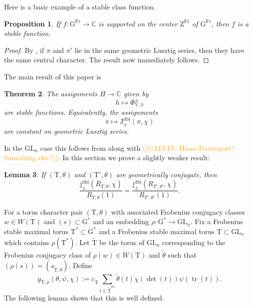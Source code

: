 \documentclass[12pt, reqno]{amsart}
\newtheorem{theorem}{Theorem}[section]
\newtheorem{proposition}[theorem]{Proposition}
\newtheorem{lemma}[theorem]{Lemma}
\theoremstyle{definition}
\theoremstyle{definition}
\theoremstyle{definition}
\newcommand{\cComplex}{\mathbb{C}}
\newcommand{\hermitianSpace}{\mathrm{V}}
\newcommand{\trace}{\operatorname{tr}}
\newcommand{\GL}{\mathrm{GL}}
\newcommand{\Frobenius}{\operatorname{Fr}}
\newcommand{\genHermitianJacobiKernel}[2]{\Phi^{\pm}_{#1,#2}}
\newcommand{\dblJacobiSumScalar}[2]{\mathrm{J}_{\pm}^{\mathrm{dbl}}\left(#1, #2\right)}
\newcommand{\dblVirtualJacobiSumScalar}[2]{\mathrm{j}_{\pm}^{\mathrm{dbl}}\left(#1, #2\right)}
\newcommand{\algebraicGroup}[1]{\boldsymbol{\mathrm{#1}}}
\newcommand{\calvin}[1]{\textcolor{orange}{\sffamily ((CALVIN: #1))}}
\begin{document}
Here is a basic example of a stable class function.
\begin{proposition}
\label{prop:central_char}
    If $f \colon \algebraicGroup{G}^{\Frobenius} \to \cComplex$ is supported on the center $\algebraicGroup{Z}^{\Frobenius}$ of $\algebraicGroup{G}^{\Frobenius}$, then $f$ is a stable function.
\end{proposition}
\begin{proof}
By \cite[Lemma 2.2]{Malle2007}, if $\pi$ and $\pi'$ lie in the same geometric Lusztig series, then they have the same central character. The result now immediately follows.
\end{proof}


The main result of this paper is 
\begin{theorem}
\label{thm:Phi_stable}
	The assignments $H \to \cComplex$ given by $$h \mapsto \genHermitianJacobiKernel{\hermitianSpace}{h}$$ are stable functions. Equivalently, the assignments $$\pi \mapsto \dblJacobiSumScalar{\pi}{\chi}$$ are constant on geometric Lusztig series.
\end{theorem}
In the $\GL_n$ case this follows from  along with \calvin{Hasse-Davenport? Something else?}.
In this section we prove a slightly weaker result:

\begin{lemma}
\label{lem:indep_geo_conj}
    If $(\algebraicGroup{T},\theta)$ and $(\algebraicGroup{T}', \theta)$ are geometrically conjugate, then $$\frac{\dblVirtualJacobiSumScalar{R_{T, \theta}}{\chi}}{R_{T,\theta}(1)} = \frac{\dblVirtualJacobiSumScalar{R_{T', \theta'}}{\chi}}{R_{T',\theta'}(1)}.$$
\end{lemma}


For a torus character pair $(\algebraicGroup{T},\theta)$ with associated Frobenius conjugacy classes $w \in W(\algebraicGroup{T})$ and $(s) \subset \algebraicGroup{G}^*$ and an embedding $\rho:\algebraicGroup{G}^* \to \algebraicGroup{\GL}_n$.  Fix a Frobenius stable maximal torus $\algebraicGroup{T}^* \subset \algebraicGroup{G}^*$ and a Frobenius stable maximal torus $\algebraicGroup{T} \subset \algebraicGroup{\GL}_n$ which contains $\rho(\algebraicGroup{T}^*)$. Let $\tilde{\algebraicGroup{T}}$ be the torus of $\algebraicGroup{\GL}_n$ corresponding to the Frobenius conjugacy class of $\rho(w) \in W(\algebraicGroup{T})$ and $\tilde{\theta}$ such that $(\rho(s)) = (s_{\tilde{\algebraicGroup{T}},\tilde{\theta}})$. Define
\[
    g_{\algebraicGroup{T},\rho}(\theta,\psi,\chi) := \varepsilon_{\algebraicGroup{
    \tilde{\algebraicGroup{T}}}}\sum_{t\in \tilde{\algebraicGroup{T}}^{\Frobenius}} \tilde{\theta}(t)\chi(\det(t))\psi(\trace(t)).
\]
The following lemma shows that this is well defined.
\end{document}
